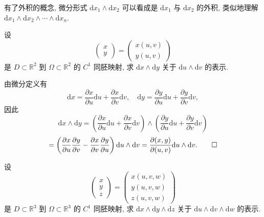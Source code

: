 有了外积的概念, 微分形式 $\mathrm dx_1\wedge\mathrm dx_2$ 可以看成是 $\mathrm dx_1$ 与 $\mathrm dx_2$ 的外积, 类似地理解 $\mathrm dx_1\wedge\mathrm dx_2\wedge\cdots\wedge\mathrm dx_n$.

\begin{example}\label{example:ma-16-6-1}
设
\[
  \begin{pmatrix}x\\y\end{pmatrix}
  =
  \begin{pmatrix}x(u,v)\\y(u,v)\end{pmatrix}
\]
是 $D\subset\mathbb R^2$ 到 $\Omega\subset\mathbb R^2$ 的 $C^1$ 同胚映射, 求 $\mathrm dx\wedge\mathrm dy$ 关于 $\mathrm du\wedge\mathrm dv$ 的表示.
\end{example}


\begin{solve}
由微分定义有
\[
  \mathrm dx=\frac{\partial x}{\partial u}\mathrm du+\frac{\partial x}{\partial v}\mathrm dv,
  \quad
  \mathrm dy=\frac{\partial y}{\partial u}\mathrm du+\frac{\partial y}{\partial v}\mathrm dv,
\]
因此
\[
  \mathrm dx\wedge\mathrm dy
  =\left(\frac{\partial x}{\partial u}\mathrm du+\frac{\partial x}{\partial v}\mathrm dv\right)
  \wedge
  \left(\frac{\partial y}{\partial u}\mathrm du+\frac{\partial y}{\partial v}\mathrm dv\right)
\]
\[
  =\left(\frac{\partial x}{\partial u}\frac{\partial y}{\partial v}
  -\frac{\partial x}{\partial v}\frac{\partial y}{\partial u}\right)\mathrm du\wedge\mathrm dv
  =\frac{\partial(x,y)}{\partial(u,v)}\mathrm du\wedge\mathrm dv.
\qedhere
\]
\end{solve}


\begin{example}\label{example:ma-16-6-2}
设
\[
  \begin{pmatrix}x\\y\\z\end{pmatrix}
  =
  \begin{pmatrix}x(u,v,w)\\y(u,v,w)\\z(u,v,w)\end{pmatrix}
\]
是 $D\subset\mathbb R^3$ 到 $\Omega\subset\mathbb R^3$ 的 $C^1$ 同胚映射, 求 $\mathrm dx\wedge\mathrm dy\wedge\mathrm dz$ 关于 $\mathrm du\wedge\mathrm dv\wedge\mathrm dw$ 的表示.
\end{example}


